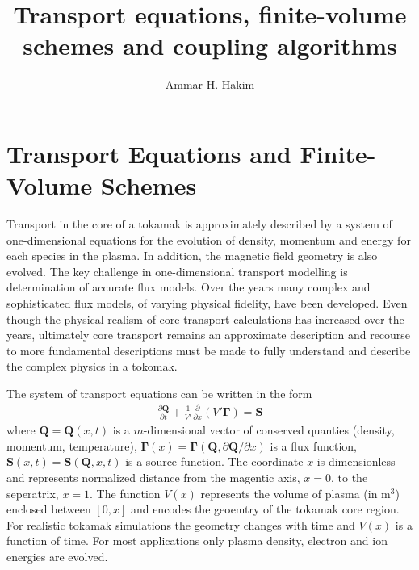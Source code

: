 \documentclass[11pt]{article}
\title{Transport equations, finite-volume schemes and coupling
  algorithms}%
\author{Ammar H. Hakim}%
\date{}
\newcommand{\pfrac}[2]{\frac{\partial #1}{\partial #2}}
\newcommand{\pfraca}[1]{\frac{\partial}{\partial #1}}
\newcommand{\pfracb}[2]{\partial #1/\partial #2}
\newcommand{\mvec}[1]{\mathbf{#1}}
\newcommand{\gvec}[1]{\boldsymbol{#1}}
\begin{document}
\maketitle

\section{Transport Equations and Finite-Volume Schemes}

Transport in the core of a tokamak is approximately described by a
system of one-dimensional equations for the evolution of density,
momentum and energy for each species in the plasma. In addition, the
magnetic field geometry is also evolved. The key challenge in
one-dimensional transport modelling is determination of accurate flux
models. Over the years many complex and sophisticated flux models, of
varying physical fidelity, have been developed. Even though the
physical realism of core transport calculations has increased over the
years, ultimately core transport remains an approximate description
and recourse to more fundamental descriptions must be made to fully
understand and describe the complex physics in a tokomak.

The system of transport equations can be written in the form
\begin{align}
  \pfrac{\mvec{Q}}{t} 
  + \frac{1}{V'} \pfraca{x} \left( V' \gvec{\Gamma} \right) = \mvec{S}
\end{align}
where $\mvec{Q} = \mvec{Q}(x,t)$ is a $m$-dimensional vector of
conserved quanties (density, momentum, temperature), $\gvec{\Gamma}(x)
= \gvec{\Gamma}(\mvec{Q},\pfracb{\mvec{Q}}{x})$ is a flux function,
$\mvec{S}(x,t) = \mvec{S}(\mvec{Q},x,t)$ is a source function. The
coordinate $x$ is dimensionless and represents normalized distance
from the magentic axis, $x=0$, to the seperatrix, $x=1$. The function
$V(x)$ represents the volume of plasma (in m$^3$) enclosed between
$[0,x]$ and encodes the geoemtry of the tokamak core region. For
realistic tokamak simulations the geometry changes with time and
$V(x)$ is a function of time. For most applications only plasma
density, electron and ion energies are evolved.
\end{document}
